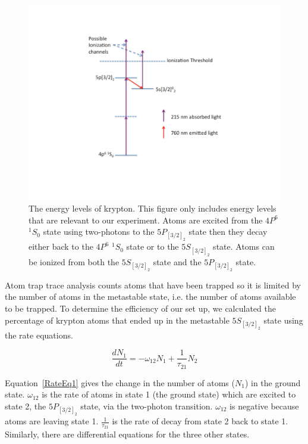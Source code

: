 \documentclass[prb,preprint]{revtex4-1}
\begin{document}
\begin{figure}[h!]
\centering
\includegraphics[width=6in]{KrEnergyLevels.pdf}
\caption{The energy levels of krypton. This figure only includes energy levels that are relevant to our experiment. Atoms are excited from the $4P^6$ $^1S_0$ state using two-photons to the $5P_{[3/2]_2}$ state then they decay either back to the $4P^6$ $^1S_0$ state or to the $5S_{[3/2]_2}$ state. Atoms can be ionized from both the $5S_{[3/2]_2}$ state and the $5P_{[3/2]_2}$ state.}
\label{KrEnergyLevels}
\end{figure}


Atom trap trace analysis counts atoms that have been trapped so it is limited by the number of atoms in the metastable state, i.e. the number of atoms available to be trapped. To determine the efficiency of our set up, we calculated the percentage of krypton atoms that ended up in the metastable $5S_{[3/2]_2}$ state using the rate equations.

\begin{equation}
\label{RateEq1}
\frac{dN_1}{dt} = -\omega_{12}N_1 + \frac{1}{\tau_{21}}N_2
\end{equation}

Equation~\ref{RateEq1} gives the change in the number of atoms ($N_1$) in the ground state. $\omega_{12}$ is the rate of atoms in state 1 (the ground state) which are excited to state 2, the $5P_{[3/2]_2}$ state, via the two-photon transition. $\omega_{12}$ is negative because atoms are leaving state 1. $\frac{1}{\tau_{21}}$ is the rate of decay from state 2 back to state 1. Similarly, there are differential equations for the three other states.
\end{document}
